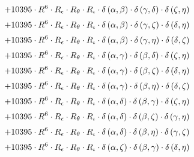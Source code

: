 \begin{subequations}
\begin{gather}
 \\[0.2em] \notag 		 + 10395 \cdot R^{6} \cdot R_{\epsilon{}} \cdot R_{\theta{}} \cdot R_{\iota{}} \cdot \delta{}\left(\alpha{}, \beta{}\right) \cdot \delta{}\left(\gamma{}, \delta{}\right) \cdot \delta{}\left(\zeta{}, \eta{}\right) 
 \\[0.2em] \notag 		 + 10395 \cdot R^{6} \cdot R_{\epsilon{}} \cdot R_{\theta{}} \cdot R_{\iota{}} \cdot \delta{}\left(\alpha{}, \beta{}\right) \cdot \delta{}\left(\gamma{}, \zeta{}\right) \cdot \delta{}\left(\delta{}, \eta{}\right) 
 \\[0.2em] \notag 		 + 10395 \cdot R^{6} \cdot R_{\epsilon{}} \cdot R_{\theta{}} \cdot R_{\iota{}} \cdot \delta{}\left(\alpha{}, \beta{}\right) \cdot \delta{}\left(\gamma{}, \eta{}\right) \cdot \delta{}\left(\delta{}, \zeta{}\right) 
 \\[0.2em] \notag 		 + 10395 \cdot R^{6} \cdot R_{\epsilon{}} \cdot R_{\theta{}} \cdot R_{\iota{}} \cdot \delta{}\left(\alpha{}, \gamma{}\right) \cdot \delta{}\left(\beta{}, \delta{}\right) \cdot \delta{}\left(\zeta{}, \eta{}\right) 
 \\[0.2em] \notag 		 + 10395 \cdot R^{6} \cdot R_{\epsilon{}} \cdot R_{\theta{}} \cdot R_{\iota{}} \cdot \delta{}\left(\alpha{}, \gamma{}\right) \cdot \delta{}\left(\beta{}, \zeta{}\right) \cdot \delta{}\left(\delta{}, \eta{}\right) 
 \\[0.2em] \notag 		 + 10395 \cdot R^{6} \cdot R_{\epsilon{}} \cdot R_{\theta{}} \cdot R_{\iota{}} \cdot \delta{}\left(\alpha{}, \gamma{}\right) \cdot \delta{}\left(\beta{}, \eta{}\right) \cdot \delta{}\left(\delta{}, \zeta{}\right) 
 \\[0.2em] \notag 		 + 10395 \cdot R^{6} \cdot R_{\epsilon{}} \cdot R_{\theta{}} \cdot R_{\iota{}} \cdot \delta{}\left(\alpha{}, \delta{}\right) \cdot \delta{}\left(\beta{}, \gamma{}\right) \cdot \delta{}\left(\zeta{}, \eta{}\right) 
 \\[0.2em] \notag 		 + 10395 \cdot R^{6} \cdot R_{\epsilon{}} \cdot R_{\theta{}} \cdot R_{\iota{}} \cdot \delta{}\left(\alpha{}, \delta{}\right) \cdot \delta{}\left(\beta{}, \zeta{}\right) \cdot \delta{}\left(\gamma{}, \eta{}\right) 
 \\[0.2em] \notag 		 + 10395 \cdot R^{6} \cdot R_{\epsilon{}} \cdot R_{\theta{}} \cdot R_{\iota{}} \cdot \delta{}\left(\alpha{}, \delta{}\right) \cdot \delta{}\left(\beta{}, \eta{}\right) \cdot \delta{}\left(\gamma{}, \zeta{}\right) 
 \\[0.2em] \notag 		 + 10395 \cdot R^{6} \cdot R_{\epsilon{}} \cdot R_{\theta{}} \cdot R_{\iota{}} \cdot \delta{}\left(\alpha{}, \zeta{}\right) \cdot \delta{}\left(\beta{}, \gamma{}\right) \cdot \delta{}\left(\delta{}, \eta{}\right) 

\end{gather}
\end{subequations}
